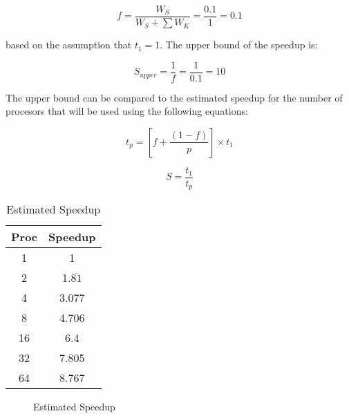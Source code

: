 \documentclass{article}
\begin{document}
  \[ f = \frac{W_S}{W_S + \sum W_K} = \frac{0.1}{1} = 0.1 \]

  based on the assumption that \( t_1 = 1 \). The upper bound of the speedup 
  is:

  \[ S_{upper} = \frac{1}{f} = \frac{1}{0.1} = 10 \]

  The upper bound can be compared to the estimated speedup for the number of
  procesors that will be used using the following equations:

  \[ t_p = \left[ f + \frac{\left( 1 - f \right)}{p} \right] \times t_1 \]

  \[ S = \frac{t_1}{t_p} \]

  \begin{table}[h]
    \centering

    \begin{tabular}{|c|c|}
      \hline
      Proc & Speedup \\
      \hline
      1  & 1                  \\
      2  & 1.$\overline{81}$  \\
      4  & 3.077              \\
      8  & 4.706              \\
      16 & 6.4                \\
      32 & 7.805              \\
      64 & 8.767              \\
      \hline
    \end{tabular}
    \caption{Estimated Speedup}
    \label{tab:estspeeduptab}
  \end{table}

  \begin{figure}[h]
    \centering

    \caption{Estimated Speedup}
    \label{fig:estspeedupfig}
  \end{figure}
\end{document}
